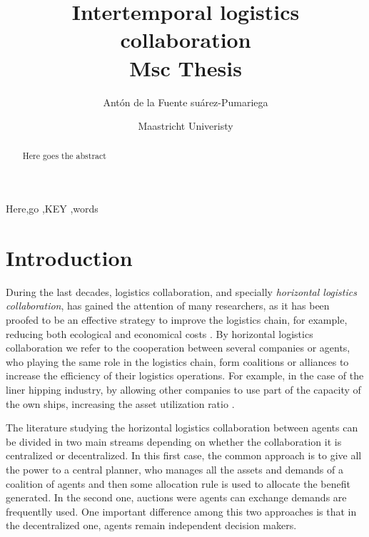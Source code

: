 \documentclass[review]{elsarticle}
\begin{document}
\begin{frontmatter}

\title{Intertemporal logistics collaboration \\[5pt]
                \normalsize{Msc Thesis}}

\author{Antón de la Fuente suárez-Pumariega}
\address{a.delafuentesuarez-pumariega@student.maastrichtuniverisry.nl }

\author{Maastricht Univeristy}



\begin{abstract}
Here goes the abstract
\end{abstract}

\begin{keyword}
Here\sep go \sep KEY \sep words
\end{keyword}

\end{frontmatter}


\section{Introduction}

During the last decades, logistics collaboration, and specially \emph{horizontal
logistics collaboration}, has gained the attention of many researchers, as it
has been proofed to be an effective strategy to improve the logistics chain, for
example, reducing both ecological and economical 
costs \cite{BALLOT2010} \cite{SOYSAL2018168}. By horizontal logistics collaboration we refer to the
cooperation between several companies or agents, who playing the same role in
the logistics chain, form coalitions or alliances to increase the efficiency of
their logistics operations. For example, in the case of the liner hipping
industry, by allowing other companies to use part of the capacity of the own
ships, increasing the asset utilization ratio \cite{AGARWAL2008175}.

The literature studying the horizontal logistics collaboration between agents
can be divided in two main streams depending on whether the collaboration it is
centralized or decentralized. In this first case, the common approach is to give all the power to a central planner, who manages all the assets and demands of a coalition of agents and then some allocation rule is used to allocate the benefit generated. In the second one, auctions were agents can exchange demands are frequentlly used. One important difference among this two approaches is that in the decentralized one, agents remain independent decision makers.
\end{document}
